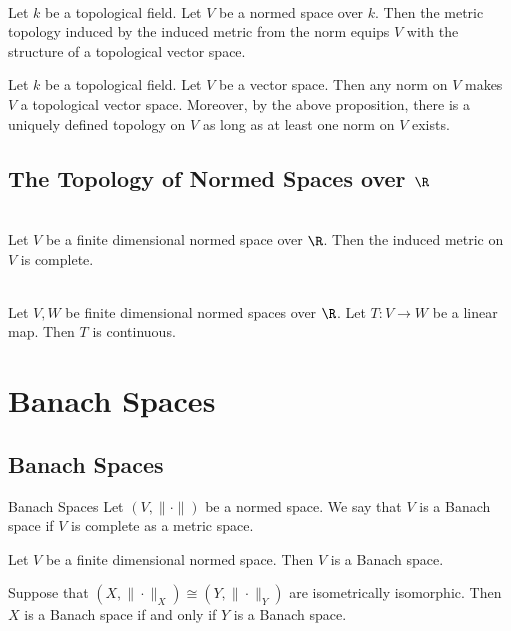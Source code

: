 \documentclass[a4paper]{article}
\begin{document}
\begin{lmm}{}{}\\
Let $k$ be a topological field. Let $V$ be a normed space over $k$. Then the metric topology induced by the induced metric from the norm equips $V$ with the structure of a topological vector space. 
\end{lmm}

Let $k$ be a topological field. Let $V$ be a vector space. Then any norm on $V$ makes $V$ a topological vector space. Moreover, by the above proposition, there is a uniquely defined topology on $V$ as long as at least one norm on $V$ exists. 

\subsection{The Topology of Normed Spaces over $\R$}
\begin{prp}{}{}\\
Let $V$ be a finite dimensional normed space over $\R$. Then the induced metric on $V$ is complete. 
\end{prp}

\begin{prp}{}{}\\
Let $V,W$ be finite dimensional normed spaces over $\R$. Let $T:V\to W$ be a linear map. Then $T$ is continuous. 
\end{prp}

\pagebreak
\section{Banach Spaces}
\subsection{Banach Spaces}
\begin{defn}{Banach Spaces}{} Let $(V,\|\cdot\|)$ be a normed space. We say that $V$ is a Banach space if $V$ is complete as a metric space. 
\end{defn}

\begin{prp}{}{} Let $V$ be a finite dimensional normed space. Then $V$ is a Banach space. 
\end{prp}

\begin{lmm}{}{} Suppose that $(X,\|\cdot\|_X)\cong(Y,\|\cdot\|_Y)$ are isometrically isomorphic. Then $X$ is a Banach space if and only if $Y$ is a Banach space. 
\end{lmm}
\end{document}
